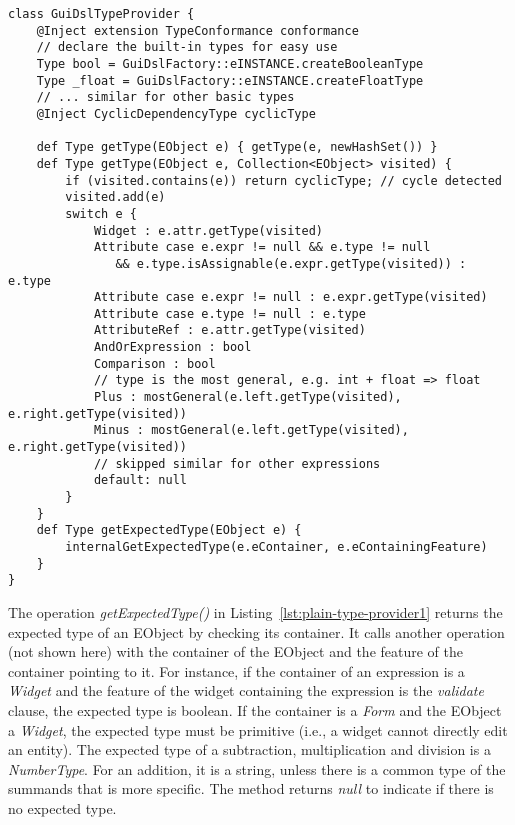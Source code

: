 \begin{lstlisting}[language=xtend,float=tb,label=lst:plain-type-provider1,caption=Type provider in Xtend.] 
class GuiDslTypeProvider {
	@Inject extension TypeConformance conformance
	// declare the built-in types for easy use
	Type bool = GuiDslFactory::eINSTANCE.createBooleanType
	Type _float = GuiDslFactory::eINSTANCE.createFloatType
	// ... similar for other basic types
	@Inject CyclicDependencyType cyclicType

	def Type getType(EObject e) { getType(e, newHashSet()) }
	def Type getType(EObject e, Collection<EObject> visited) {
		if (visited.contains(e)) return cyclicType; // cycle detected
		visited.add(e)
		switch e {
			Widget : e.attr.getType(visited)
			Attribute case e.expr != null && e.type != null 
			   && e.type.isAssignable(e.expr.getType(visited)) : e.type
			Attribute case e.expr != null : e.expr.getType(visited)
			Attribute case e.type != null : e.type
			AttributeRef : e.attr.getType(visited)
			AndOrExpression : bool 
			Comparison : bool
			// type is the most general, e.g. int + float => float
			Plus : mostGeneral(e.left.getType(visited), e.right.getType(visited))
			Minus : mostGeneral(e.left.getType(visited), e.right.getType(visited))
			// skipped similar for other expressions
			default: null
		}
	} 
	def Type getExpectedType(EObject e) {
		internalGetExpectedType(e.eContainer, e.eContainingFeature) 
	} 
}
\end{lstlisting}

The operation \emph{getExpectedType()} in Listing~\ref{lst:plain-type-provider1}
returns the expected type of an EObject by checking its container. It calls
another operation (not shown here) with the container of the EObject and the
feature of the container pointing to it. For instance, if the container of an
expression is a \emph{Widget} and the feature of the widget containing the
expression is the \emph{validate} clause, the expected type is boolean. If the
container is a \emph{Form} and the EObject a \emph{Widget}, the expected type
must be primitive (i.e., a widget cannot directly edit an entity).
The expected type of a subtraction, multiplication and division is a
\emph{NumberType}. For an addition, it is a string, unless there is a common
type of the summands that is more specific. The method returns \emph{null} to
indicate if there is no expected type.

